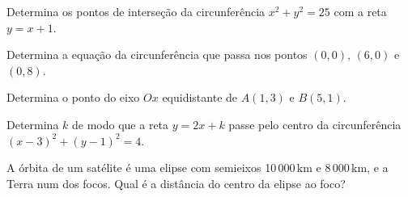 \documentclass[12pt]{article}
\begin{document}
\begin{exercicios}
  \item Determina os pontos de interseção da circunferência $x^2 + y^2 = 25$ com a reta $y = x + 1$.
  \item Determina a equação da circunferência que passa nos pontos $(0, 0)$, $(6, 0)$ e $(0, 8)$.
  \item Determina o ponto do eixo $Ox$ equidistante de $A(1, 3)$ e $B(5, 1)$.
  \item Determina $k$ de modo que a reta $y = 2x + k$ passe pelo centro da circunferência $(x - 3)^2 + (y - 1)^2 = 4$.
  \item A órbita de um satélite é uma elipse com semieixos 10\,000\,km e 8\,000\,km, e a Terra num dos focos. Qual é a distância do centro da elipse ao foco?
\end{exercicios}
\end{document}
